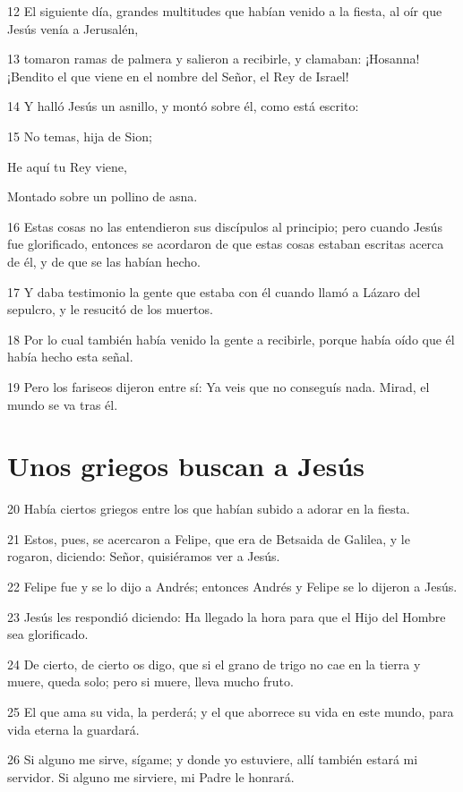\par 12 El siguiente día, grandes multitudes que habían venido a la fiesta, al oír que Jesús venía a Jerusalén,
\par 13 tomaron ramas de palmera y salieron a recibirle, y clamaban: ¡Hosanna!¡Bendito el que viene en el nombre del Señor, el Rey de Israel!
\par 14 Y halló Jesús un asnillo, y montó sobre él, como está escrito:
\par 15 No temas, hija de Sion;
\par He aquí tu Rey viene,
\par Montado sobre un pollino de asna.
\par 16 Estas cosas no las entendieron sus discípulos al principio; pero cuando Jesús fue glorificado, entonces se acordaron de que estas cosas estaban escritas acerca de él, y de que se las habían hecho.
\par 17 Y daba testimonio la gente que estaba con él cuando llamó a Lázaro del sepulcro, y le resucitó de los muertos.
\par 18 Por lo cual también había venido la gente a recibirle, porque había oído que él había hecho esta señal.
\par 19 Pero los fariseos dijeron entre sí: Ya veis que no conseguís nada. Mirad, el mundo se va tras él.

\section*{Unos griegos buscan a Jesús}

\par 20 Había ciertos griegos entre los que habían subido a adorar en la fiesta.
\par 21 Estos, pues, se acercaron a Felipe, que era de Betsaida de Galilea, y le rogaron, diciendo: Señor, quisiéramos ver a Jesús.
\par 22 Felipe fue y se lo dijo a Andrés; entonces Andrés y Felipe se lo dijeron a Jesús.
\par 23 Jesús les respondió diciendo: Ha llegado la hora para que el Hijo del Hombre sea glorificado.
\par 24 De cierto, de cierto os digo, que si el grano de trigo no cae en la tierra y muere, queda solo; pero si muere, lleva mucho fruto.
\par 25 El que ama su vida, la perderá; y el que aborrece su vida en este mundo, para vida eterna la guardará.
\par 26 Si alguno me sirve, sígame; y donde yo estuviere, allí también estará mi servidor. Si alguno me sirviere, mi Padre le honrará.

